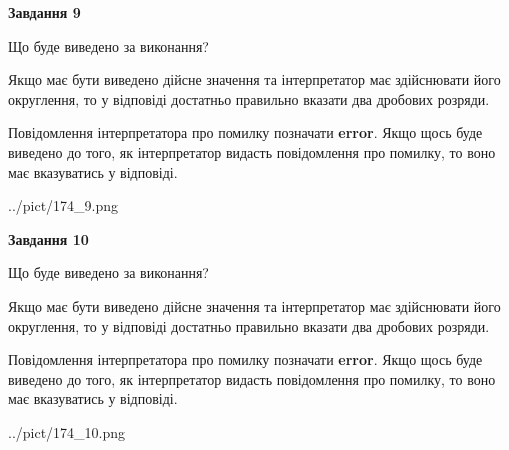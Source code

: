 \documentclass[12pt, ukrainian]{article}
\begin{document}
{\begin {Large}
{\begin {center}\textbf{Завдання 9}\end {center}}\par
Що буде виведено за виконання? \par

Якщо має бути виведено дійсне значення та інтерпретатор має здійснювати його округлення, 
то у відповіді достатньо правильно вказати два дробових розряди.

Повідомлення інтерпретатора про помилку позначати \textbf{error}.
Якщо щось буде виведено до того, як інтерпретатор видасть повідомлення про помилку, 
то воно має вказуватись у відповіді. \par

\begin{center}
	{../pict/174_9.png}
\end{center}
\newpage

{\begin {center}\textbf{Завдання 10}\end {center}}\par
Що буде виведено за виконання? \par

Якщо має бути виведено дійсне значення та інтерпретатор має здійснювати його округлення, 
то у відповіді достатньо правильно вказати два дробових розряди.

Повідомлення інтерпретатора про помилку позначати \textbf{error}.
Якщо щось буде виведено до того, як інтерпретатор видасть повідомлення про помилку, 
то воно має вказуватись у відповіді. \par

\begin{center}
	{../pict/174_10.png}
\end{center}
\newpage

\end {Large}}
\end{document}
